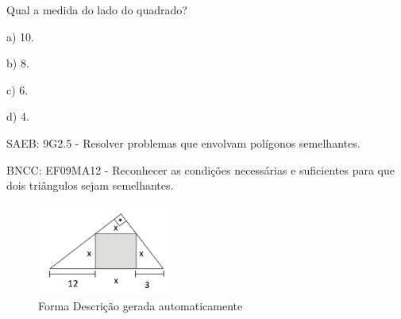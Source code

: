 \begin{escolha}
\begin{boxmedio}
\begin{boxmedio}
{\begin{boxpeq}
\begin{boxpeq}
{\begin{boxpeq}
\begin{boxmedio}
\begin{boxmedio}
\begin{boxpeq}
\begin{boxmedio}
\begin{boxpeq}
\begin{boxpeq}
\begin{boxpeq}
\begin{boxpeq}
\begin{boxmedio}
{\begin{boxmedio}
\begin{boxmedio}
\begin{boxpeq}
\begin{boxmedio}
\begin{boxpeq}
\begin{boxpeq}
\begin{boxpeq}
\begin{escolha}
{\begin{boxmedio}
\begin{boxpeq}
\begin{boxpeq}
\begin{boxpeq}
\begin{boxpeq}
\begin{boxpeq}
\begin{boxmedio}
\begin{boxpeq}
\begin{boxpeq}
\begin{boxpeq}
{\begin{boxpeq}
\begin{boxmedio}
\begin{boxpeq}
\begin{boxpeq}
\begin{boxpeq}
{\begin{boxpeq}
\begin{boxmedio}
{\begin{boxpeq}
\begin{boxpeq}
\begin{boxmedio}
\begin{boxmedio}
\begin{boxpeq}
\begin{boxpeq}
{\begin{boxpeq}
\begin{boxpeq}
\begin{boxpeq}
\begin{boxpeq}
\begin{boxpeq}
\begin{escolha}
\begin{escolha}
{\begin{boxmedio}
\begin{boxpeq}
\begin{q°}
\begin{boxmedio}
\begin{boxpeq}
\begin{boxpeq}
\begin{boxmedio}
\begin{boxmedio}
\begin{boxmedio}
\begin{boxmedio}
{\begin{escolha}
\begin{escolha}
\begin{escolha}
\begin{escolha}
\begin{escolha}
\begin{escolha}
{\begin{figure}
\end{figure}

Qual a medida do lado do quadrado?

a) 10.

b) 8.

c) 6.

d) 4.

SAEB: 9G2.5 - Resolver problemas que envolvam polígonos semelhantes.

BNCC: EF09MA12 - Reconhecer as condições necessárias e suficientes para
que dois triângulos sejam semelhantes.

\begin{figure}
\centering
\includegraphics[width=1.75521in,height=1.18424in]{./_SAEB_9_MAT/media/image273.png}
\caption{Forma Descrição gerada automaticamente}
\end{figure}

}
\end{escolha}
\end{escolha}
\end{escolha}
\end{escolha}
\end{escolha}
\end{escolha}}
\end{boxmedio}
\end{boxmedio}
\end{boxmedio}
\end{boxmedio}
\end{boxpeq}
\end{boxpeq}
\end{boxmedio}
\end{q°}
\end{boxpeq}
\end{boxmedio}}
\end{escolha}
\end{escolha}
\end{boxpeq}
\end{boxpeq}
\end{boxpeq}
\end{boxpeq}
\end{boxpeq}}
\end{boxpeq}
\end{boxpeq}
\end{boxmedio}
\end{boxmedio}
\end{boxpeq}
\end{boxpeq}}
\end{boxmedio}
\end{boxpeq}}
\end{boxpeq}
\end{boxpeq}
\end{boxpeq}
\end{boxmedio}
\end{boxpeq}}
\end{boxpeq}
\end{boxpeq}
\end{boxpeq}
\end{boxmedio}
\end{boxpeq}
\end{boxpeq}
\end{boxpeq}
\end{boxpeq}
\end{boxpeq}
\end{boxmedio}}
\end{escolha}
\end{boxpeq}
\end{boxpeq}
\end{boxpeq}
\end{boxmedio}
\end{boxpeq}
\end{boxmedio}
\end{boxmedio}}
\end{boxmedio}
\end{boxpeq}
\end{boxpeq}
\end{boxpeq}
\end{boxpeq}
\end{boxmedio}
\end{boxpeq}
\end{boxmedio}
\end{boxmedio}
\end{boxpeq}}
\end{boxpeq}
\end{boxpeq}}
\end{boxmedio}
\end{boxmedio}
\end{escolha}
